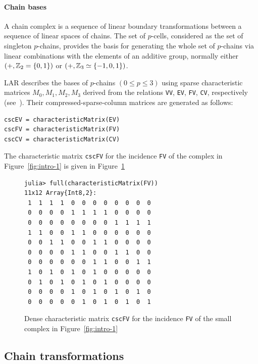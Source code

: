\paragraph{Chain bases}

A chain complex is a sequence of linear boundary transformations between a sequence of linear spaces of chains. The set of $p$-cells, considered as the set of singleton $p$-chains, provides the basis for generating the whole set of $p$-chains via linear combinations with the elements of an additive group, normally either $(+,\mathbb{Z}_2=\{0,1\})$ or $(+,\mathbb{Z}_3\simeq\{-1,0,1\})$.

LAR describes the bases of $p$-chains $(0\leq p\leq 3)$ using sparse characteristic matrices  $M_0, M_1, M_2, M_3$ derived from the relations \texttt{VV}, \texttt{EV}, \texttt{FV}, \texttt{CV}, respectively  (see~\cite{Dicarlo:2014:TNL:2543138.2543294}).
Their compressed-sparse-column matrices are generated as follows:
{\small\begin{verbatim}
cscEV = characteristicMatrix(EV)
cscFV = characteristicMatrix(FV)
cscCV = characteristicMatrix(CV)
\end{verbatim}}

The characteristic matrix \texttt{cscFV} for the incidence \texttt{FV} of the complex in Figure~\ref{fig:intro-1} is given in Figure~\ref{fig:intro-0}

\begin{figure}[htbp] %
\begin{center}
\begin{minipage}[c]{0.5\textwidth}
\small\begin{verbatim}
julia> full(characteristicMatrix(FV))
11x12 Array{Int8,2}:
 1  1  1  1  0  0  0  0  0  0  0  0
 0  0  0  0  1  1  1  1  0  0  0  0
 0  0  0  0  0  0  0  0  1  1  1  1
 1  1  0  0  1  1  0  0  0  0  0  0
 0  0  1  1  0  0  1  1  0  0  0  0
 0  0  0  0  1  1  0  0  1  1  0  0
 0  0  0  0  0  0  1  1  0  0  1  1
 1  0  1  0  1  0  1  0  0  0  0  0
 0  1  0  1  0  1  0  1  0  0  0  0
 0  0  0  0  1  0  1  0  1  0  1  0
 0  0  0  0  0  1  0  1  0  1  0  1
\end{verbatim}
\end{minipage}
\end{center}
   \caption{Dense characteristic matrix \texttt{cscFV} for the incidence \texttt{FV} of the small complex in Figure~\ref{fig:intro-1}}
   \label{fig:intro-0}
\end{figure}

\subsection{Chain transformations}

